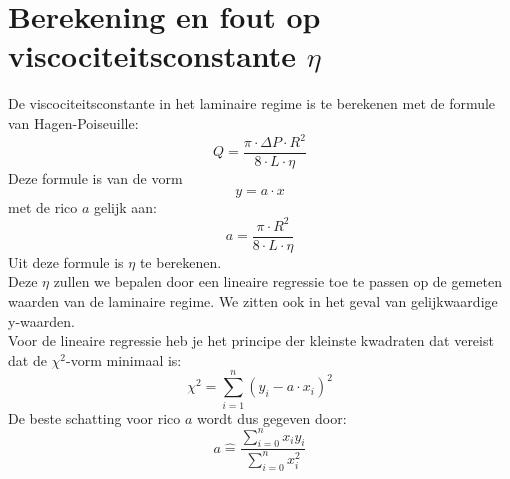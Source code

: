 \section{Berekening en fout op viscociteitsconstante $\eta$}

De viscociteitsconstante in het laminaire regime is te berekenen met de formule van Hagen-Poiseuille:
\begin{equation}
    Q = \frac{\pi \cdot \Delta P \cdot R^2}{8 \cdot L \cdot \eta}
\end{equation}
Deze formule is van de vorm $$y=a\cdot x$$ met de rico $a$ gelijk aan: $$a = \frac{\pi \cdot R^2}{8 \cdot L \cdot \eta}$$
Uit deze formule is $\eta$ te berekenen.\\

Deze $\eta$ zullen we bepalen door een lineaire regressie toe te passen op de gemeten waarden van de laminaire regime.
We zitten ook in het geval van gelijkwaardige y-waarden.\\

Voor de lineaire regressie heb je het principe der kleinste kwadraten dat vereist
dat de $\chi ^2$-vorm minimaal is: 
\begin{equation}
    \chi ^2 = \sum\limits_{i=1}^n(y_i-a\cdot x_i)^2
\end{equation}
De beste schatting voor rico $a$ wordt dus gegeven door:
\begin{equation}
    a \hat{=} \frac{\sum\limits_{i=0}^n x_i  y_i}{\sum\limits_{i=0}^n x_i^2}
\end{equation}



